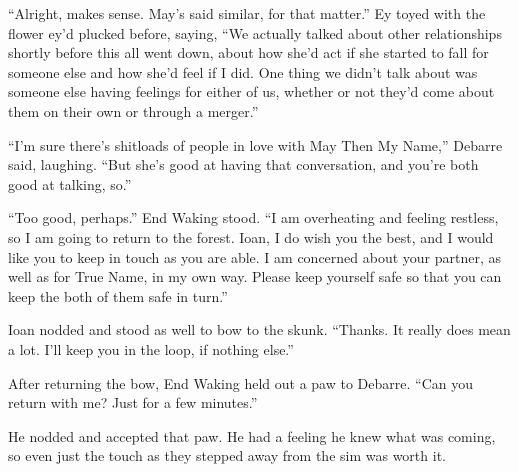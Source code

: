 ``Alright, makes sense. May's said similar, for that matter.'' Ey toyed with the flower ey'd plucked before, saying, ``We actually talked about other relationships shortly before this all went down, about how she'd act if she started to fall for someone else and how she'd feel if I did. One thing we didn't talk about was someone else having feelings for either of us, whether or not they'd come about them on their own or through a merger.''

``I'm sure there's shitloads of people in love with May Then My Name,'' Debarre said, laughing. ``But she's good at having that conversation, and you're both good at talking, so.''

``Too good, perhaps.'' End Waking stood. ``I am overheating and feeling restless, so I am going to return to the forest. Ioan, I do wish you the best, and I would like you to keep in touch as you are able. I am concerned about your partner, as well as for True Name, in my own way. Please keep yourself safe so that you can keep the both of them safe in turn.''

Ioan nodded and stood as well to bow to the skunk. ``Thanks. It really does mean a lot. I'll keep you in the loop, if nothing else.''

After returning the bow, End Waking held out a paw to Debarre. ``Can you return with me? Just for a few minutes.''

He nodded and accepted that paw. He had a feeling he knew what was coming, so even just the touch as they stepped away from the sim was worth it.
